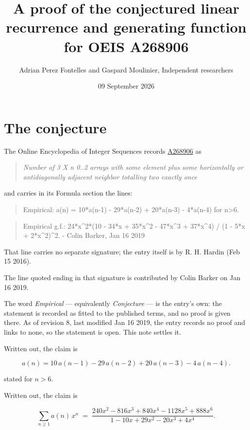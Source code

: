 \documentclass[11pt]{article}
\title{A proof of the conjectured linear recurrence and generating function for OEIS A268906}
\author{Adrian Perez Fontelles and Gaspard Moulinier, Independent researchers}
\date{09 September 2026}
\theoremstyle{definition}
\begin{document}
\maketitle
\section{The conjecture}

The Online Encyclopedia of Integer Sequences records \href{https://oeis.org/A268906}{A268906} as

\begin{quote}\itshape Number of 3 X n 0..2 arrays with some element plus some horizontally or antidiagonally adjacent neighbor totalling two exactly once\end{quote}

and carries in its Formula section the lines:

\begin{quote}\ttfamily Empirical: a(n) = 10*a(n-1) - 29*a(n-2) + 20*a(n-3) - 4*a(n-4) for n>6.\end{quote}

\begin{quote}\ttfamily Empirical g.f.: 24*x\textasciicircum{}2*(10 - 34*x + 35*x\textasciicircum{}2 - 47*x\textasciicircum{}3 + 37*x\textasciicircum{}4) / (1 - 5*x + 2*x\textasciicircum{}2)\textasciicircum{}2. - Colin Barker, Jan 16 2019\end{quote}

That line carries no separate signature; the entry itself is by R. H. Hardin (Feb 15 2016).

The line quoted ending in that signature is contributed by Colin Barker on Jan 16 2019.

The word {\itshape Empirical} --- equivalently {\itshape Conjecture} --- is the entry's own: the statement is recorded as fitted to the published terms, and no proof is given there. As of revision 8, last modified Jan 16 2019, the entry records no proof and links to none, so the statement is open. This note settles it.

Written out, the claim is

\[a(n) = 10\,a(n-1) - 29\,a(n-2) + 20\,a(n-3) - 4\,a(n-4).\]

stated for $n > 6$.

Written out, the claim is

\[\sum_{n \ge 1} a(n)\,x^n \;=\; \frac{240x^{2} - 816x^{3} + 840x^{4} - 1128x^{5} + 888x^{6}}{1 - 10x + 29x^{2} - 20x^{3} + 4x^{4}}.\]
\end{document}
